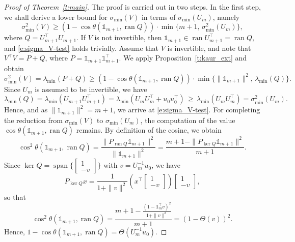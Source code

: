 \documentclass[a4paper, reqno]{amsart}
\newcommand{\one}{\mathds{1}}
\begin{document}
\begin{proof}[Proof of Theorem~\ref{t:main}]The proof is carried out in two steps. In the first step, we shall derive a lower bound for $\sigma_\mathrm{min}(V)$ in terms of $\sigma_\mathrm{min}(U_m)$, namely
\begin{equation}\label{e:sigma_V-test}
    \sigma_\mathrm{min}^2(V) \ge (1 - \cos\theta(\one_{m+1},\operatorname{ran} Q))\cdot\min\big\{m+1,\,\sigma_\mathrm{min}^2(U_m)\big\},
\end{equation}
where $Q = U_{m+1}^\top U_{m+1}$.
If $V$ is not invertible, then $\one_{m+1}\in\operatorname{ran}U_{m+1}^\top = \operatorname{ran}Q$, and \cref{e:sigma_V-test} holds trivially. Assume that $V$ is invertible, and note that $V^\top V = P + Q$, where $P = \one_{m+1}\one_{m+1}^\top$. We apply Proposition~\ref{t:kaur_ext} and obtain
\begin{equation*}
\sigma_\mathrm{min}^2(V) = \lambda_\mathrm{min}(P+Q) \geq (1 - \cos\theta(\one_{m+1},\operatorname{ran}Q))\cdot\min\{\|\one_{m+1}\|^2,\,\lambda_{\min}(Q)\}.
\end{equation*}
Since $U_m$ is assumed to be invertible, we have
\begin{equation*}
        \lambda_{\min}(Q) = \lambda_{\min}(U_{m+1}U_{m+1}^\top) = \lambda_{\min}(U_mU_m^\top + u_0u_0^\top)\,\ge\,\lambda_{\min}(U_mU_m^\top) = \sigma_\mathrm{min}^2(U_m).
\end{equation*}
Hence, and as $\|\one_{m+1}\|^2 = m+1$, we arrive at \cref{e:sigma_V-test}. For completing the reduction from $\sigma_\mathrm{min}(V)$ to $\sigma_\mathrm{min}(U_m)$, the computation of the value $\cos\theta(\one_{m+1},\operatorname{ran}Q)$ remains. By definition of the cosine, we obtain
\[
\cos^2\theta(\one_{m+1},\operatorname{ran}Q) = \frac{\|P_{\operatorname{ran}Q}\one_{m+1}\|^2}{\|\one_{m+1}\|^2} = \frac{m+1 - \|P_{\ker Q}\one_{m+1}\|^2}{m+1}.
\]
Since $\ker Q = \operatorname{span}\{[\begin{smallmatrix} 1\\-v\end{smallmatrix}]\}$ with $v = U_m^{-1} u_0$, we have \[P_{\ker Q}x = \frac 1{1+\|v\|^2}(x^\top\left[\begin{smallmatrix}1\\-v\end{smallmatrix}\right])\left[\begin{smallmatrix}1\\-v\end{smallmatrix}\right],\] so that
\[
\cos^2\theta(\one_{m+1},\operatorname{ran}Q) = \frac{m+1 - \frac{(1 - \one_m^\top v)^2}{1+\|v\|^2}}{m+1} = (1 - \Theta(v))^2.
\]
Hence, $1 - \cos\theta(\one_{m+1},\operatorname{ran}Q) = \Theta(U_m^{-1}u_0)$.


\end{proof}
\end{document}
